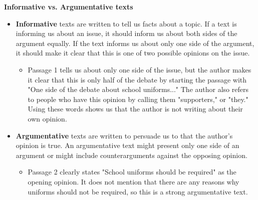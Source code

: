 \documentclass[12pt]{article}
\begin{document}
\begin{tcolorbox}[colframe=black!60, colback=white, 
coltitle=black, colbacktitle=black!15, fonttitle=\bfseries\Large, 
title=Examples, halign title=center, left=10pt, right=10pt, top=10pt, bottom=15pt]
\textbf{Informative vs. Argumentative texts}
\begin{itemize}
    \item \textbf{Informative} texts are written to tell us facts about a topic. If a text is informing us about an issue,  it should inform us about both sides of the argument equally. If the text informs us about only one side of the argument, it should make it clear that this is one of two possible opinions on the issue.
    \begin{itemize}
        \item Passage 1 tells us about only one side of the issue, but the author makes it clear that this is only half of the debate by starting the passage with "One side of the debate about school uniforms..." The author also refers to people who have this opinion by calling them "supporters," or "they." Using these words shows us that the author is not writing about their own opinion.
    \end{itemize}
    \item \textbf{Argumentative }texts are written to persuade us to that the author's opinion is true. An argumentative text might present only one side of an argument or might include counterarguments against the opposing opinion. 
    \begin{itemize}
        \item Passage 2 clearly states "School uniforms should be required" as the opening opinion. It does not mention that there are any reasons why uniforms should not be required, so this is a strong argumentative text.
    \end{itemize}
  
\end{itemize}

\end{tcolorbox}



\vspace{1em}
\end{document}

